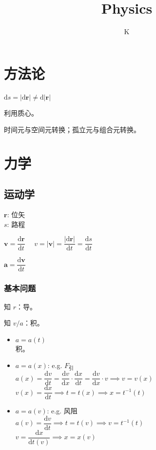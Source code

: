 \documentclass[12pt, a4paper, UTF8, openany]{ctexbook}
\title{Physics}
\author{K}
\newcommand{\dif}{\mathrm{d}}
\newcommand{\vect}[1]{\mathbf{#1}}
\newcommand{\vecr}{\vect{r}}
\newcommand{\vecv}{\vect{v}}
\newcommand{\veca}{\vect{a}}
\begin{document}
    \maketitle

    \tableofcontents %
    \cleardoublepage %

    \chapter{方法论}
    $\dif s = |\dif \vect{r}| \neq \dif |\vect{r}|$

    利用质心。

    时间元与空间元转换；孤立元与组合元转换。

    \chapter{力学}

    \section{运动学}
    $\vecr$: 位矢 \\
    $s$: 路程

    $\vecv = \dfrac{\dif \vecr}{\dif t}\quad$
    $v = |\vecv| = \dfrac{|\dif \vecr|}{\dif t} = \dfrac{\dif s}{\dif t}$

    $\veca = \dfrac{\dif \vecv}{\dif t}$
    
        \subsection{基本问题}
            知 $r$：导。

            知 $v/a$：积。
            \begin{itemize}
                \item $a = a(t)$ \\
                    积。
                \item $a = a(x)$: e.g. $F_{\text{引}}$ \\
                    $a(x) = \dfrac{\dif v}{\dif t} = \dfrac{\dif v}{\dif x} \cdot \dfrac{\dif x}{\dif t} 
                    = \dfrac{\dif v}{\dif x} \cdot v \implies v = v(x)$ \\
                    $v(x) = \dfrac{\dif x}{\dif t} \implies t = t(x) \implies x = t^{-1}(t)$
                \item $a = a(v)$: e.g. 风阻 \\
                    $a(v) = \dfrac{\dif v}{\dif t} \implies t = t(v) \implies v = t^{-1}(t)$ \\
                    $v = \dfrac{\dif x}{\dif t(v)} \implies x = x(v)$
            \end{itemize}
\end{document}
